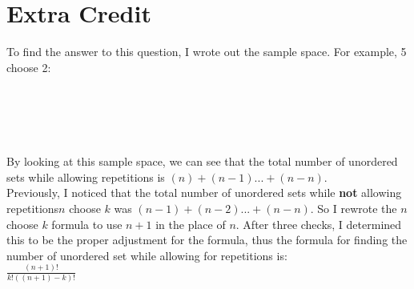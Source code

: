 \documentclass[11pt]{article}
\begin{document}
\section*{Extra Credit}
\noindent
To find the answer to this question, I wrote out the sample space. For example, 5 choose 2:\\
\big[ aa, ab, ac, ad, ae \big]\\
\big[ bb, bc, bd, be \big]\\
\big[ cc, cd, ce \big]\\
\big[ dd, de \big]\\
\big[ ee \big]\\
By looking at this sample space, we can see that the total number of unordered sets while allowing repetitions is $ (n) + (n-1) ... + (n-n) $.\\
Previously, I noticed that the total number of unordered sets while \textbf{not} allowing repetitions$ n $ choose $ k $ was $ (n - 1) + (n-2) ... + (n-n) $. So I rewrote the $ n $ choose $ k $ formula to use $ n + 1 $ in the place of $ n $. After three checks, I determined this to be the proper adjustment for the formula, thus the formula for finding the number of unordered set while allowing for repetitions is:\\
$ \frac{(n + 1)!}{k!((n + 1) - k)!}$
\end{document}

